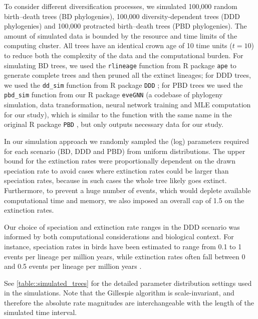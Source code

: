{To consider different diversification processes, we simulated 100,000 random birth--death trees (BD phylogenies), 100,000 diversity-dependent trees (DDD phylogenies) and 100,000 protracted birth--death trees (PBD phylogenies). The amount of simulated data is bounded by the resource and time limits of the computing cluster. All trees have an identical crown age of 10 time units ($t = 10$) to reduce both the complexity of the data and the computational burden. For simulating BD trees, we used the \texttt{rlineage} function from R package \texttt{ape} \citep{paradis_ape_2019} to generate complete trees and then pruned all the extinct lineages; for DDD trees, we used the \texttt{dd\_sim} function from R package \texttt{DDD} \citep{etienne_diversity-dependence_2012}; for PBD trees we used the \texttt{pbd\_sim} function from our R package \texttt{eveGNN} (a codebase of phylogeny simulation, data transformation, neural network training and MLE computation for our study), which is similar to the function with the same name in the original R package \texttt{PBD} \citep{etienne_prolonging_2012}, but only outputs necessary data for our study.

In our simulation approach we randomly sampled the (log) parameters required for each scenario (BD, DDD and PBD) from uniform distributions. The upper bound for the extinction rates were proportionally dependent on the drawn speciation rate to avoid cases where extinction rates could be larger than speciation rates, because in such cases the whole tree likely goes extinct. Furthermore, to prevent a huge number of events, which would deplete available computational time and memory, we also imposed an overall cap of 1.5 on the extinction rates. 

Our choice of speciation and extinction rate ranges in the DDD scenario was informed by both computational considerations and biological context. For instance, speciation rates in birds have been estimated to range from 0.1 to 1 events per lineage per million years, while extinction rates often fall between 0 and 0.5 events per lineage per million years \citep{stadler_estimating_2013,henao_diaz_macroevolutionary_2019}.

See \autoref{table::simulated_trees} for the detailed parameter distribution settings used in the simulations. Note that the Gillespie algorithm is scale-invariant, and therefore the absolute rate magnitudes are interchangeable with the length of the simulated time interval.

}

